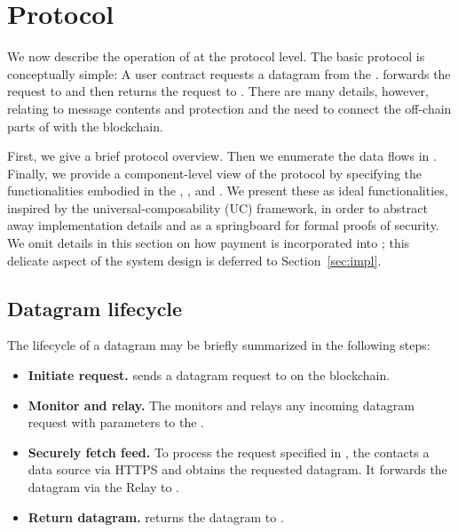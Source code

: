 

\section{\tc Protocol}

We now describe the operation of \tc at the protocol level. The basic protocol is conceptually simple: A user contract \reqcont requests a datagram from the \tcontract \tcont. \tcont forwards the request to \engine and then returns the request to \reqcont. There are many details, however, relating to message contents and protection and the need to connect the off-chain parts of \tc with the blockchain.

First, we give a brief protocol overview. Then we enumerate the data flows in \tc. Finally, we provide a component-level view of the protocol by specifying the functionalities embodied in the \tcontract, \medname, and \encname. We present these  as ideal functionalities, inspired by the universal-composability (UC) framework, in order to abstract away implementation details and as a springboard for formal proofs of security. We omit details in this section on how payment is incorporated into \tc; this delicate aspect of the system design is deferred to Section~\ref{sec:impl}.

\subsection{Datagram lifecycle}

The lifecycle of a datagram may be briefly summarized in the following steps:

\begin{itemize}
\item {\bf Initiate request.} \reqcont sends a datagram request to \tcont on the blockchain.

\item {\bf Monitor and relay.} The \medname monitors \tcont and relays any incoming datagram request with parameters \dgform to the \encname.

\item {\bf Securely fetch feed.} To process the request specified in \dgform, the \encname contacts a data source via HTTPS and obtains the requested datagram. It forwards the datagram via the Relay to \tcont.

\item {\bf Return datagram.} \tcont returns the datagram to \reqcont.
\end{itemize}

